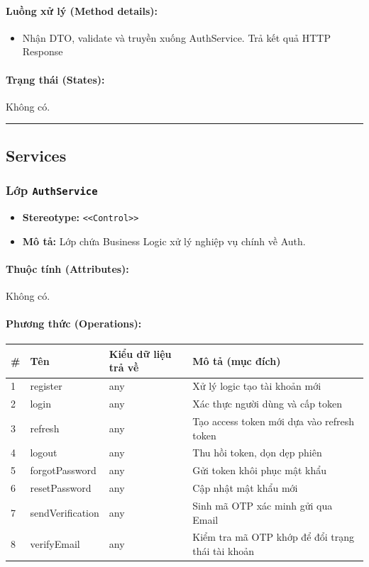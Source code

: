 \documentclass[12pt,a4paper]{article}
\begin{document}
\paragraph{Luồng xử lý (Method details):}
\begin{itemize}[leftmargin=*]
    \item Nhận DTO, validate và truyền xuống AuthService. Trả kết quả HTTP Response
\end{itemize}


\paragraph{Trạng thái (States):}
Không có.

\vskip 0.5cm
\noindent\rule{\textwidth}{0.5pt}
\vskip 0.5cm

\subsection{Services}


\subsubsection{Lớp \texttt{AuthService}}

\begin{itemize}[leftmargin=*]
    \item \textbf{Stereotype:} \texttt{\textless{}\textless{}Control\textgreater{}\textgreater{}}
    \item \textbf{Mô tả:} Lớp chứa Business Logic xử lý nghiệp vụ chính về Auth.
\end{itemize}

\paragraph{Thuộc tính (Attributes):}
Không có.

\paragraph{Phương thức (Operations):}
\begin{longtable}{|p{0.6cm}|p{5.0cm}|p{2.8cm}|p{5.4cm}|}
\hline
\textbf{\#} & \textbf{Tên} & \textbf{Kiểu dữ liệu trả về} & \textbf{Mô tả (mục đích)} \\ \hline
\endhead
1 & register & any & Xử lý logic tạo tài khoản mới \\ \hline
2 & login & any & Xác thực người dùng và cấp token \\ \hline
3 & refresh & any & Tạo access token mới dựa vào refresh token \\ \hline
4 & logout & any & Thu hồi token, dọn dẹp phiên \\ \hline
5 & forgotPassword & any & Gửi token khôi phục mật khẩu \\ \hline
6 & resetPassword & any & Cập nhật mật khẩu mới \\ \hline
7 & sendVerification & any & Sinh mã OTP xác minh gửi qua Email \\ \hline
8 & verifyEmail & any & Kiểm tra mã OTP khớp để đổi trạng thái tài khoản \\ \hline
\end{longtable}
\end{document}
